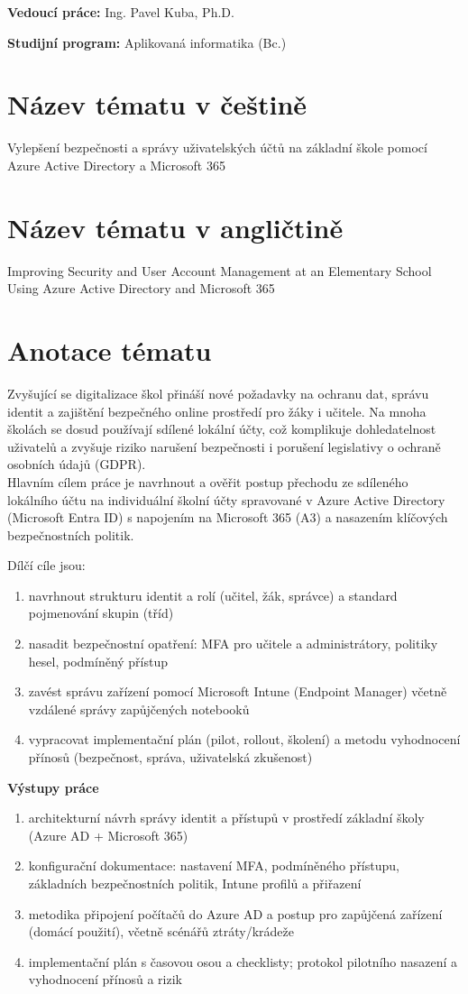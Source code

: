\documentclass[a4paper]{article}
\begin{document}
\noindent\textbf{Vedoucí práce:} Ing. Pavel Kuba, Ph.D.

\noindent\textbf{Studijní program:} Aplikovaná informatika (Bc.)

\section*{Název tématu v češtině}
Vylepšení bezpečnosti a správy uživatelských účtů na základní škole pomocí Azure Active Directory a Microsoft 365

\section*{Název tématu v angličtině}
Improving Security and User Account Management at an Elementary School Using Azure Active Directory and Microsoft 365

\section*{Anotace tématu}
Zvyšující se digitalizace škol přináší nové požadavky na ochranu dat, správu identit a zajištění bezpečného online prostředí pro žáky i učitele. Na mnoha školách se dosud používají sdílené lokální účty, což komplikuje dohledatelnost uživatelů a zvyšuje riziko narušení bezpečnosti i porušení legislativy o ochraně osobních údajů (GDPR).\\
Hlavním cílem práce je navrhnout a ověřit postup přechodu ze sdíleného lokálního účtu na individuální školní účty spravované v Azure Active Directory (Microsoft Entra ID) s napojením na Microsoft 365 (A3) a nasazením klíčových bezpečnostních politik. 

\noindent Dílčí cíle jsou:
\begin{enumerate}
\item navrhnout strukturu identit a rolí (učitel, žák, správce) a standard pojmenování skupin (tříd)
\item nasadit bezpečnostní opatření: MFA pro učitele a administrátory, politiky hesel, podmíněný přístup
\item zavést správu zařízení pomocí Microsoft Intune (Endpoint Manager) včetně vzdálené správy zapůjčených notebooků
\item vypracovat implementační plán (pilot, rollout, školení) a metodu vyhodnocení přínosů (bezpečnost, správa, uživatelská zkušenost)
\end{enumerate}

\noindent\textbf{Výstupy práce}
\begin{enumerate}
\item architekturní návrh správy identit a přístupů v prostředí základní školy (Azure AD + Microsoft 365)
\item konfigurační dokumentace: nastavení MFA, podmíněného přístupu, základních bezpečnostních politik, Intune profilů a přiřazení
\item metodika připojení počítačů do Azure AD a postup pro zapůjčená zařízení (domácí použití), včetně scénářů ztráty/krádeže
\item implementační plán s časovou osou a checklisty; protokol pilotního nasazení a vyhodnocení přínosů a rizik
\end{enumerate}
\end{document}
